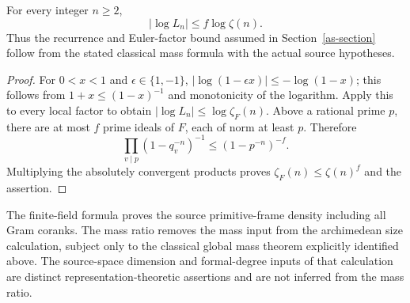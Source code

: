 \begin{corollary}\label{md-euler-bound}
For every integer $n\geq2$,
\[
                         |\log L_n|\leq f\log\zeta(n).
\]
Thus the recurrence and Euler-factor bound assumed in
Section~\ref{as-section} follow from the stated classical
mass formula with the actual source hypotheses.
\end{corollary}

\begin{proof}
For $0<x<1$ and $\epsilon\in\{1,-1\}$,
$|\log(1-\epsilon x)|\leq-\log(1-x)$; this follows from
$1+x\leq(1-x)^{-1}$ and monotonicity of the logarithm.
Apply this to every local factor to obtain
$|\log L_n|\leq\log\zeta_F(n)$.
Above a rational prime $p$, there are at most $f$ prime ideals
of $F$, each of norm at least $p$. Therefore
\[
 \prod_{v\mid p}(1-q_v^{-n})^{-1}
                             \leq(1-p^{-n})^{-f}.
\]
Multiplying the absolutely convergent products proves
$\zeta_F(n)\leq\zeta(n)^f$ and the assertion.
\end{proof}

The finite-field formula proves the source primitive-frame density
including all Gram coranks. The mass ratio removes the mass input
from the archimedean size calculation, subject only to the classical
global mass theorem explicitly identified above. The source-space
dimension and formal-degree inputs of that calculation are distinct
representation-theoretic assertions and are not inferred from the
mass ratio.


